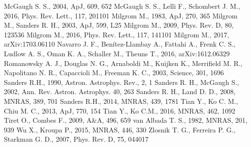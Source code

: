 \documentclass[fleqn,usenatbib,useAMS]{mnras}
\begin{document}
\begin{thebibliography}{}
McGaugh S. S., 2004, ApJ, 609, 652
McGaugh S. S., Lelli F., Schombert J. M., 2016, Phys. Rev. Lett., 117, 201101
Milgrom M., 1983, ApJ, 270, 365
Milgrom M., Sanders R. H., 2003, ApJ, 599, L25
Milgrom M., 2009, Phys. Rev. D, 80, 123536
Milgrom M., 2016, Phys. Rev. Lett., 117, 141101
Milgrom M., 2017, arXiv:1703.06110
Navarro J. F., Ben\'{i}tez-Llambay A., Fattahi A., Frenk C. S., Ludlow A. S., Oman K. A., Schaller M., Theuns T., 2016, arXiv:1612.06329
Romanowsky A. J., Douglas N. G., Arnaboldi M., Kuijken K., Merrifield
M. R., Napolitano N. R., Capaccioli M., Freeman K. C., 2003, Science, 301, 1696
Sanders R.H., 1990, Astron. Astrophys. Rev., 2, 1
Sanders R. H., McGaugh S., 2002, Ann. Rev. Astron. Astrophys. 40, 263
Sanders R. H., Land D. D., 2008, MNRAS, 389, 701
Sanders R.H., 2014, MNRAS, 439, 1781
Tian Y., Ko C. M., Chiu M. C., 2013, ApJ, 770, 154
Tian Y., Ko C.M., 2016, MNRAS, 462, 1092
Tiret O., Combes F., 2009, A\&A, 496, 659
van Albada T. S., 1982, MNRAS, 201, 939
Wu X., Kroupa P., 2015, MNRAS, 446, 330
Zlosnik T. G., Ferreira P. G., Starkman G. D., 2007, Phys. Rev. D, 75, 044017
\end{thebibliography}
\end{document}
